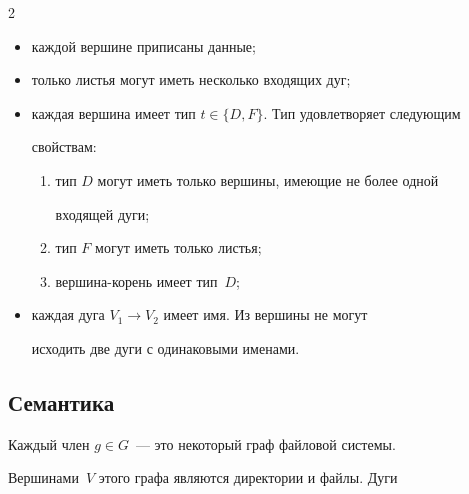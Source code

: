\begin{multicols}{2}
\begin{itemize}
отож\-де\-ст\-влять с их номерами;


\item каждой вершине приписаны данные;


\item только листья могут иметь несколько входящих дуг;


\item каждая вершина имеет тип $t\in \{D, F\}$. Тип удовлетворяет следующим 


свойствам:


\begin{enumerate}[(1)]


\item тип $D$ могут иметь только вершины, име\-ющие не более одной 


входящей дуги;\\[-13pt]


\item тип $F$ могут иметь только листья;\\[-13pt]


\item вершина-корень имеет тип~$D$;\\[-13pt] 


\end{enumerate}


\item каждая дуга $V_1\rightarrow V_2$ имеет имя. Из вершины не могут 


исходить две дуги с одинаковыми именами.


\end{itemize}





\vspace*{-4pt}





\subsection{Семантика}





\vspace*{-2pt}





      Каждый член $g\in G$~--- это некоторый граф файловой системы. 


Вершинами~$V$ этого графа являются директории и файлы. Дуги 



\end{multicols}
